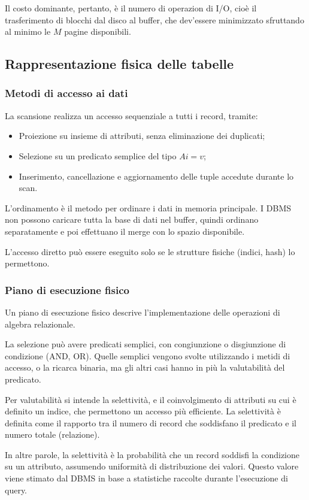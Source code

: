 Il costo dominante, pertanto, è il numero di operazion di I/O, cioè il trasferimento di blocchi dal disco al buffer, che dev'essere minimizzato sfruttando al minimo le $M$ pagine disponibili.

\subsection{Rappresentazione fisica delle tabelle}
\subsubsection{Metodi di accesso ai dati}
La scansione realizza un accesso sequenziale a tutti i record, tramite:
\begin{itemize}
	\item Proiezione su insieme di attributi, senza eliminazione dei duplicati;
	\item Selezione su un predicato semplice del tipo $Ai = v$;
	\item Inserimento, cancellazione e aggiornamento delle tuple accedute durante lo scan.
\end{itemize}

L'ordinamento è il metodo per ordinare i dati in memoria principale. I DBMS non possono caricare tutta la base di dati nel buffer, quindi ordinano separatamente e poi effettuano il merge con lo spazio disponibile.

L'accesso diretto può essere eseguito solo se le strutture fisiche (indici, hash) lo permettono.

\subsubsection{Piano di esecuzione fisico}
Un piano di esecuzione fisico descrive l'implementazione delle operazioni di algebra relazionale. 

La selezione può avere predicati semplici, con congiunzione o disgiunzione di condizione (AND, OR). Quelle semplici vengono svolte utilizzando i metidi di accesso, o la ricarca binaria, ma gli altri casi hanno in più la valutabilità del predicato.

Per valutabilità si intende la selettività, e il coinvolgimento di attributi su cui è definito un indice, che permettono un accesso più efficiente. La selettività è definita come il rapporto tra il numero di record che soddisfano il predicato e il numero totale (relazione).

In altre parole, la selettività è la probabilità che un record soddisfi la condizione su un attributo, assumendo uniformità di distribuzione dei valori. Questo valore viene stimato dal DBMS in base a statistiche raccolte durante l'esecuzione di query. 

